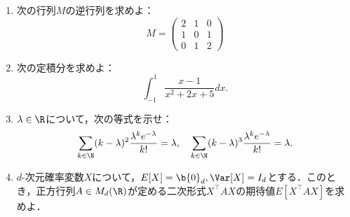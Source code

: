 \documentclass[uplatex,dvipdfmx]{jsarticle}
\begin{document}
\begin{tcolorbox}[colframe=ForestGreen, colback=ForestGreen!10!white,breakable,colbacktitle=ForestGreen!40!white,coltitle=black,fonttitle=\bfseries\sffamily,
    title=第１問]
    \begin{problem}\mbox{}
        \begin{enumerate}
            \item 次の行列$M$の逆行列を求めよ：
            \[M=\begin{pmatrix}2&1&0\\1&0&1\\0&1&2\end{pmatrix}\]
            \item 次の定積分を求めよ：
            \[\int^1_{-1}\frac{x-1}{x^2+2x+5}dx.\]
            \item $\lambda\in\R$について，次の等式を示せ：
            \[\sum_{k\in\N}(k-\lambda)^2\frac{\lambda^ke^{-\lambda}}{k!}=\lambda,\quad\sum_{k\in\N}(k-\lambda)^3\frac{\lambda^ke^{-\lambda}}{k!}=\lambda.\]
            \item $d$-次元確率変数$X$について，$E[X]=\b{0}_d,\Var[X]=I_d$とする．このとき，正方行列$A\in M_d(\R)$が定める二次形式$X^\top AX$の期待値$E[X^\top AX]$を求めよ．
        \end{enumerate}
    \end{problem}
\end{tcolorbox}
\end{document}
